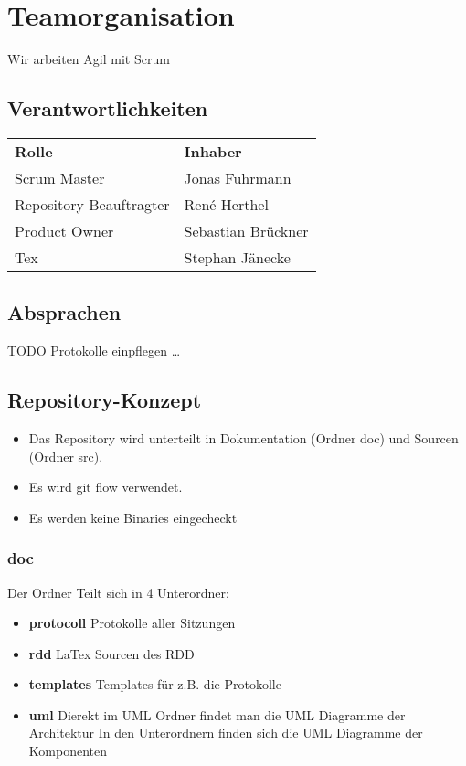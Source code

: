 \chapter{Teamorganisation}

Wir arbeiten Agil mit Scrum

\section{Verantwortlichkeiten}

\begin{tabular}{ll}
  \textbf{Rolle} & \textbf{Inhaber}\\
   Scrum Master & Jonas Fuhrmann\\
   Repository Beauftragter & René Herthel\\
   Product Owner & Sebastian Brückner\\
   Tex & Stephan Jänecke
 \end{tabular}

\section{Absprachen}

TODO Protokolle einpflegen \ldots

\section{Repository-Konzept}

\begin{itemize}
	\item Das Repository wird unterteilt in Dokumentation (Ordner doc) und Sourcen (Ordner src).
	\item Es wird git flow verwendet.
	\item Es werden keine Binaries eingecheckt
\end{itemize}

\subsection{doc}
Der Ordner Teilt sich in 4 Unterordner:
\begin{itemize}
	\item \textbf{protocoll} Protokolle aller Sitzungen
	\item \textbf{rdd}  LaTex Sourcen des RDD
	\item \textbf{templates} Templates für z.B. die Protokolle
	\item \textbf{uml} Dierekt im UML Ordner findet man die UML Diagramme der Architektur
	In den Unterordnern finden sich die UML Diagramme der Komponenten
\end{itemize}


	